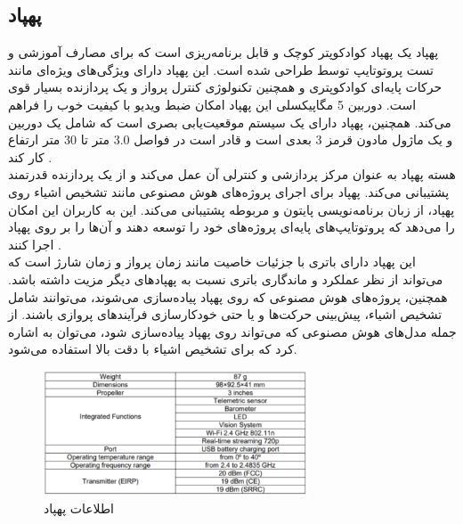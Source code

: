 \subsection{پهپاد }
پهپاد  یک پهپاد کوادکوپتر کوچک و قابل برنامه‌ریزی است که برای مصارف آموزشی و تست پروتوتایپ توسط  طراحی شده است. این پهپاد دارای ویژگی‌های ویژه‌ای مانند حرکات پایه‌ای کوادکوپتری و همچنین تکنولوژی 
کنترل پرواز  و یک پردازنده  بسیار قوی است. دوربین 5 مگاپیکسلی این پهپاد امکان ضبط ویدیو با کیفیت خوب را فراهم می‌کند. همچنین، پهپاد دارای یک سیستم موقعیت‌یابی بصری  است که شامل 
یک دوربین و یک ماژول مادون قرمز 3 بعدی است و قادر است در فواصل 3.0 متر تا 30 متر ارتفاع کار کند .
\\
هسته پهپاد به عنوان مرکز پردازشی و کنترلی آن عمل می‌کند و از یک پردازنده  قدرتمند پشتیبانی می‌کند. پهپاد  برای اجرای پروژه‌های هوش مصنوعی مانند تشخیص اشیاء روی پهپاد، از زبان 
برنامه‌نویسی پایتون و  مربوطه پشتیبانی می‌کند. این  به کاربران این امکان را می‌دهد که پروتوتایپ‌های پایه‌ای پروژه‌های خود را توسعه دهند و آن‌ها را بر روی پهپاد اجرا کنند .
\\
این پهپاد دارای باتری با جزئیات خاصیت مانند زمان پرواز و زمان شارژ است که می‌تواند از نظر عملکرد و ماندگاری باتری نسبت به پهپاد‌های دیگر مزیت داشته باشد. همچنین، پروژه‌های هوش مصنوعی که روی پهپاد  پیاده‌سازی می‌شوند، 
می‌توانند شامل تشخیص اشیاء، پیش‌بینی حرکت‌ها و یا حتی خودکارسازی فرآیندهای پروازی باشند. از جمله مدل‌های هوش مصنوعی که می‌تواند روی پهپاد  پیاده‌سازی شود، می‌توان به  اشاره کرد که برای تشخیص اشیاء با دقت بالا استفاده می‌شود.
\cite{bhujbal2022custom}

\begin{figure}[h]
    \centering
    \includegraphics[width=0.7\textwidth]{table.png}
    \caption{اطلاعات پهپاد }
\end{figure}




